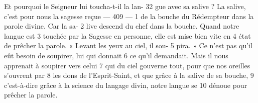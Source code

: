 Et pourquoi le Seigneur lui toucha-t-il la lan-	 
32	 	gue avec sa salive ? La salive, c'est pour nous la sagesse reçue	 
 	--- 409 ---	 
1	 	de la bouche du Rédempteur dans la parole divine. Car la sa-	 
2	 	live descend du chef dans la bouche. Quand notre langue est	 
3	 	touchée par la Sagesse en personne, elle est mise bien vite en	 
4	 	état de prêcher la parole. « Levant les yeux au ciel, il sou-	 
5	 	pira. » Ce n'est pas qu'il eût besoin de soupirer, lui qui donnait	 
6	 	ce qu'il demandait. Mais il nous apprenait à soupirer vers celui	 
7	 	qui du ciel gouverne tout, pour que nos oreilles s'ouvrent par	 
8	 	les dons de l'Esprit-Saint, et que grâce à la salive de sa bouche,	 
9	 	c'est-à-dire grâce à la science du langage divin, notre langue se	 
10	 	dénoue pour prêcher la parole.